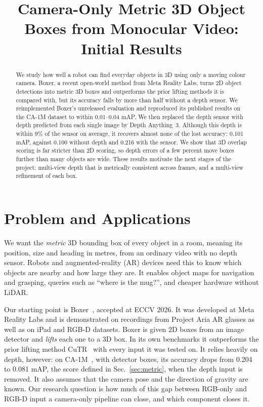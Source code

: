 \documentclass[conference]{IEEEtran}
\newcommand{\tbd}[1]{\textcolor{red}{#1}}
\begin{document}
\title{Camera-Only Metric 3D Object Boxes from Monocular Video:\\Initial Results}

\author{\IEEEauthorblockN{\tbd{Name One (student no.), Name Two (student no.), Name Three (student no.)}}
}

\maketitle

\begin{abstract}
We study how well a robot can find everyday objects in 3D using only a moving colour camera. Boxer, a recent open-world method from Meta Reality Labs, turns 2D object detections into metric 3D boxes and outperforms the prior lifting methods it is compared with, but its accuracy falls by more than half without a depth sensor. We reimplemented Boxer's unreleased evaluation and reproduced its published results on the CA-1M dataset to within 0.01--0.04 mAP. We then replaced the depth sensor with depth predicted from each single image by Depth Anything~3. Although this depth is within 9\% of the sensor on average, it recovers almost none of the lost accuracy: 0.101 mAP, against 0.100 without depth and 0.216 with the sensor. We show that 3D overlap scoring is far stricter than 2D scoring, so depth errors of a few percent move boxes further than many objects are wide. These results motivate the next stages of the project: multi-view depth that is metrically consistent across frames, and a multi-view refinement of each box.
\end{abstract}

\section{Problem and Applications}
We want the \emph{metric} 3D bounding box of every object in a room, meaning its position, size and heading in metres, from an ordinary video with no depth sensor. Robots and augmented-reality (AR) devices need this to know which objects are nearby and how large they are. It enables object maps for navigation and grasping, queries such as ``where is the mug?'', and cheaper hardware without LiDAR.

Our starting point is Boxer~\cite{boxer}, accepted at ECCV 2026. It was developed at Meta Reality Labs and is demonstrated on recordings from Project Aria AR glasses as well as on iPad and RGB-D datasets. Boxer is given 2D boxes from an image detector and \emph{lifts} each one to a 3D box. In its own benchmarks it outperforms the prior lifting method CuTR~\cite{ca1m} with every input it was tested on. It relies heavily on depth, however: on CA-1M~\cite{ca1m}, with detector boxes, its accuracy drops from 0.204 to 0.081 mAP, the score defined in Sec.~\ref{sec:metric}, when the depth input is removed. It also assumes that the camera pose and the direction of gravity are known. Our research question is how much of this gap between RGB-only and RGB-D input a camera-only pipeline can close, and which component closes it.
\end{document}
